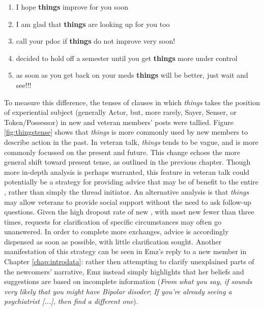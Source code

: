 \begin{enumerate} [before=\itshape,font=\normalfont] \singlespacing \setlength\itemsep{0em} \footnotesize
    \item  I hope  \textbf{things} improve for you soon
    \item  I am glad that  \textbf{things} are looking up for you too
    \item  call your pdoc if  \textbf{things} do not improve very soon!
    \item  decided to hold off a semester until you get \textbf{things} more under control
    \item  as soon as you get back on your meds \textbf{things} will be better, just wait and see!!!
    \end{enumerate}
%
To measure this difference, the tenses of clauses in which \emph{things} takes the position of experiential subject (generally Actor, but, more rarely, Sayer, Senser, or Token\slash Possessor) in new and veteran \glspl{member}' \glspl{post} were tallied. Figure \ref{fig:thingstense} shows that \emph{things} is more commonly used by new \glspl{member} to describe action in the past. In veteran talk, \emph{things} tends to be vague, and is more commonly focussed on the present and future. This change echoes the more general shift toward present tense, as outlined in the previous chapter. Though more in\hyp{}depth analysis is perhaps warranted, this feature in veteran talk could potentially be a strategy for providing advice that may be of benefit to the entire , rather than simply the \gls{thread} initiator. An alternative analysis is that \emph{things} may allow veterans to provide social support without the need to ask follow\hyp{}up questions. Given the high dropout rate of new , with most new   fewer than three times, requests for clarification of specific circumstances may often go unanswered. In order to complete more exchanges, advice is accordingly dispensed as soon as possible, with little clarification sought. Another manifestation of this strategy can be seen in Emz's reply to a new member in Chapter \ref{chap:introdata}: rather then attempting to clarify unexplained parts of the newcomers' narrative, Emz instead simply highlights that her beliefs and suggestions are based on incomplete information (\emph{From what you say, if sounds very likely that you might have Bipolar disoder}; \emph{If you're already seeing a psychiatrist [...], then find a different one}).

